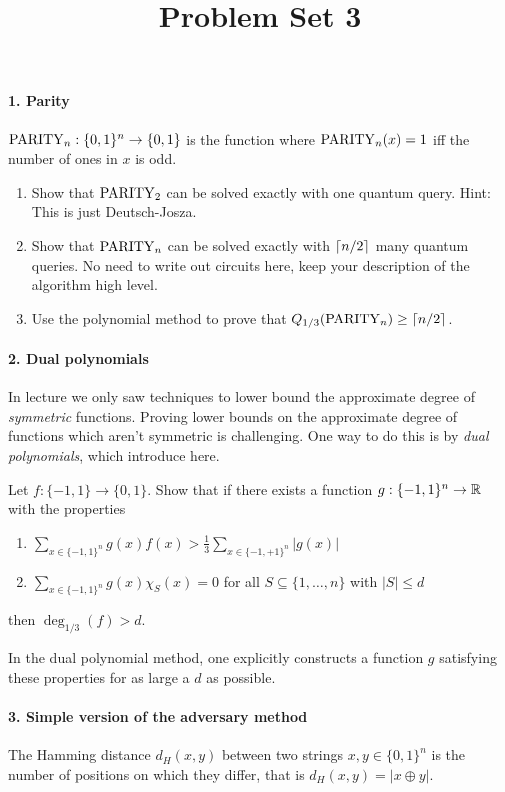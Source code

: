 


\title{Problem Set 3}
\date{}
\maketitle

\paragraph*{1. Parity}
$\mathrm{PARITY}_n : \{0,1\}^n \rightarrow \{0,1\}$ is the function where $\mathrm{PARITY}_n(x) =1$ iff the 
number of ones in $x$ is odd.  
\begin{enumerate}
  \item Show that $\mathrm{PARITY}_2$ can be solved exactly with one quantum query.  Hint: This is just Deutsch-Josza.
  \item Show that $\mathrm{PARITY}_n$ can be solved exactly with $\left\lceil n/2 \right\rceil$ many quantum queries.  No need to write out 
  circuits here, keep your description of the algorithm high level.
  \item Use the polynomial method to prove that $Q_{1/3}(\mathrm{PARITY}_n) \ge \left\lceil n/2 \right\rceil$.  
\end{enumerate}

\paragraph*{2. Dual polynomials}
In lecture we only saw techniques to lower bound the approximate degree of \emph{symmetric} functions.  Proving 
lower bounds on the approximate degree of functions which aren't symmetric is challenging.  One way to do this is by \emph{dual polynomials}, 
which introduce here.  

Let $f: \{-1,1\} \rightarrow \{0,1\}$.  
Show that if there exists a function $g: \{-1,1\}^n \rightarrow \mathbb{R}$ with the properties
\begin{enumerate}
  \item $\sum_{x \in \{-1,1\}^n} g(x) f(x) > \frac{1}{3} \sum_{x \in \{-1,+1\}^n} |g(x)|$
  \item $\sum_{x \in \{-1,1\}^n} g(x) \chi_S(x) = 0$ for all $S \subseteq \{1, \ldots, n\}$ with $|S| \le d$
\end{enumerate}
then $\deg_{1/3}(f) > d$.  

In the dual polynomial method, one explicitly constructs a function $g$ satisfying these properties for as 
large a $d$ as possible. 

\paragraph*{3. Simple version of the adversary method}
The Hamming distance $d_H(x,y)$ between two strings $x,y \in \{0,1\}^n$ is the number of positions on which they differ, 
that is $d_H(x,y) = |x \oplus y|$.  

